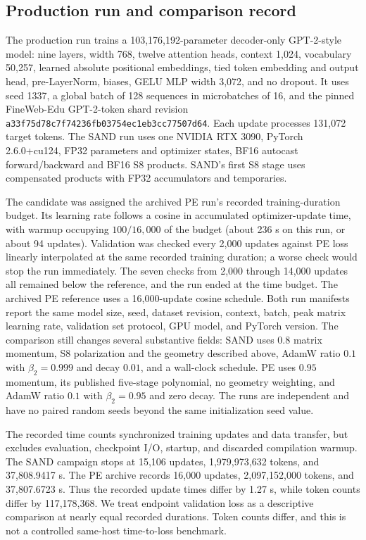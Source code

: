 \documentclass[10pt]{article}
\begin{document}
\subsection{Production run and comparison record}
The production run trains a 103,176,192-parameter decoder-only GPT-2-style model: nine layers, width 768, twelve attention heads, context 1,024, vocabulary 50,257, learned absolute positional embeddings, tied token embedding and output head, pre-LayerNorm, biases, GELU MLP width 3,072, and no dropout. It uses seed 1337, a global batch of 128 sequences in microbatches of 16, and the pinned FineWeb-Edu GPT-2-token shard revision \texttt{a33f75d78c7f74236fb03754ec1eb3cc77507d64}. Each update processes 131,072 target tokens. The SAND run uses one NVIDIA RTX 3090, PyTorch 2.6.0+cu124, FP32 parameters and optimizer states, BF16 autocast forward/backward and BF16 S8 products. SAND's first S8 stage uses compensated products with FP32 accumulators and temporaries.

The candidate was assigned the archived PE run's recorded training-duration budget. Its learning rate follows a cosine in accumulated optimizer-update time, with warmup occupying $100/16{,}000$ of the budget (about 236 s on this run, or about 94 updates). Validation was checked every 2,000 updates against PE loss linearly interpolated at the same recorded training duration; a worse check would stop the run immediately. The seven checks from 2,000 through 14,000 updates all remained below the reference, and the run ended at the time budget. The archived PE reference uses a 16,000-update cosine schedule. Both run manifests report the same model size, seed, dataset revision, context, batch, peak matrix learning rate, validation set protocol, GPU model, and PyTorch version. The comparison still changes several substantive fields: SAND uses $0.8$ matrix momentum, S8 polarization and the geometry described above, AdamW ratio $0.1$ with $\beta_2=0.999$ and decay $0.01$, and a wall-clock schedule. PE uses $0.95$ momentum, its published five-stage polynomial, no geometry weighting, and AdamW ratio $0.1$ with $\beta_2=0.95$ and zero decay. The runs are independent and have no paired random seeds beyond the same initialization seed value.

The recorded time counts synchronized training updates and data transfer, but excludes evaluation, checkpoint I/O, startup, and discarded compilation warmup. The SAND campaign stops at 15,106 updates, 1,979,973,632 tokens, and 37,808.9417 s. The PE archive records 16,000 updates, 2,097,152,000 tokens, and 37,807.6723 s. Thus the recorded update times differ by 1.27 s, while token counts differ by 117,178,368. We treat endpoint validation loss as a descriptive comparison at nearly equal recorded durations. Token counts differ, and this is not a controlled same-host time-to-loss benchmark.
\end{document}

